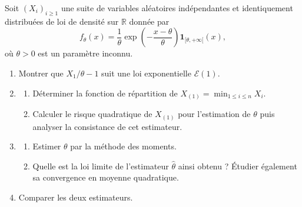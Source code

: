\begin{mdframed}
\begin{exercice}
Soit $(X_i)_{i \ge 1}$ une suite de variables aléatoires indépendantes et identiquement distribuées de loi de densité sur $\mathbb{R}$ donnée par
\begin{equation*}
f_\theta(x) = \frac{1}{\theta} \exp\left( -\frac{x - \theta}{\theta} \right) \mathbf{1}_{[\theta, +\infty[}(x),
\end{equation*}
où $\theta > 0$ est un paramètre inconnu.

\begin{enumerate}
    \item Montrer que $X_1/\theta - 1$ suit une loi exponentielle $\mathcal{E}(1)$.
    \item 
    \begin{enumerate}
        \item[i--] Déterminer la fonction de répartition de $X_{(1)} = \min_{1 \le i \le n} X_i$.
        \item[ii--] Calculer le risque quadratique de $X_{(1)}$ pour l'estimation de $\theta$ puis analyser la consistance de cet estimateur.
    \end{enumerate}
    \item 
    \begin{enumerate}
        \item[i--] Estimer $\theta$ par la méthode des moments.
        \item[ii--] Quelle est la loi limite de l'estimateur $\hat{\theta}$ ainsi obtenu ? Étudier également sa convergence en moyenne quadratique.
    \end{enumerate}
    \item Comparer les deux estimateurs.
\end{enumerate}
\end{exercice}
\end{mdframed}

\smallskip